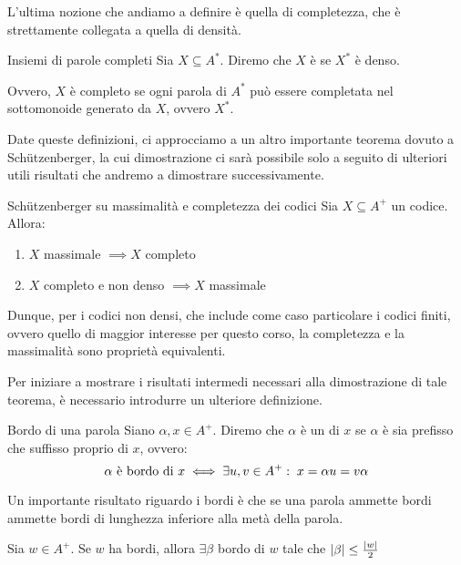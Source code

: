 L'ultima nozione che andiamo a definire è quella di completezza, che è strettamente collegata a quella di densità.
\begin{definition}{Insiemi di parole completi}
  Sia \(X \subseteq A^*\). Diremo che \(X\) è  se \(X^*\) è denso.

  Ovvero, \(X\) è completo se ogni parola di \(A^*\) può essere completata nel sottomonoide generato da \(X\), ovvero \(X^*\).
\end{definition}

Date queste definizioni, ci approcciamo a un altro importante teorema dovuto a Schützenberger, la cui dimostrazione ci sarà possibile solo a seguito di ulteriori utili risultati che andremo a dimostrare successivamente.

\begin{theorem}[label=thm:schutz_maximality_completeness]{Schützenberger su massimalità e completezza dei codici}
  Sia \(X \subseteq A^+\) un codice.
  Allora:
  \begin{enumerate}
    \item \(X\) massimale \(\implies X\) completo
    \item \(X\) completo e non denso \(\implies X\) massimale
  \end{enumerate}
\end{theorem}

Dunque, per i codici non densi, che include come caso particolare i codici finiti, ovvero quello di maggior interesse per questo corso, la completezza e la massimalità sono proprietà equivalenti.

Per iniziare a mostrare i risultati intermedi necessari alla dimostrazione di tale teorema, è necessario introdurre un ulteriore definizione.
\begin{definition}{Bordo di una parola}
  Siano \(\alpha,x \in A^+\). Diremo che \(\alpha\) è un  di \(x\) se \(\alpha\) è sia prefisso che suffisso proprio di \(x\), ovvero:
  \[\alpha \text{ è bordo di } x \iff \exists u,v \in A^+ :\; x = \alpha u = v \alpha\]
\end{definition}

Un importante risultato riguardo i bordi è che se una parola ammette bordi ammette bordi di lunghezza inferiore alla metà della parola.

\begin{proposition}[label=prop:if_border_exists_border_half_length]{}
  Sia \(w \in A^+\). Se \(w\) ha bordi, allora \(\exists \beta\) bordo di \(w\) tale che \(\left|\beta\right|\leq\frac{\left|w\right|}{2}\)
\end{proposition}

